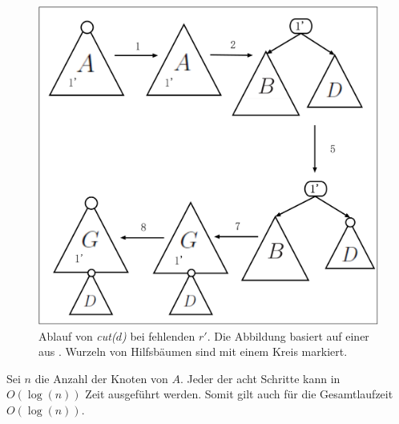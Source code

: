 \documentclass[a4paper,12pt]{article}
\begin{document}
\begin{figure}[H]
	\centering
	\includegraphics[width=1\textwidth]{"Medien/Tango/cut2"}
	\caption{Ablauf von \textit{cut($d$)} bei fehlenden $r'$. Die Abbildung basiert auf einer aus \cite{demainDinamicOpti}. Wurzeln von Hilfsbäumen sind mit einem Kreis markiert. }
	\label{fig:cut2}
\end{figure}
\noindent Sei $n$ die Anzahl der Knoten von $A$. Jeder der acht Schritte kann in $O\left(\log \left(n\right)\right)$ Zeit ausgeführt werden. Somit gilt auch für die Gesamtlaufzeit $O\left(\log \left(n\right)\right)$.
\end{document}
